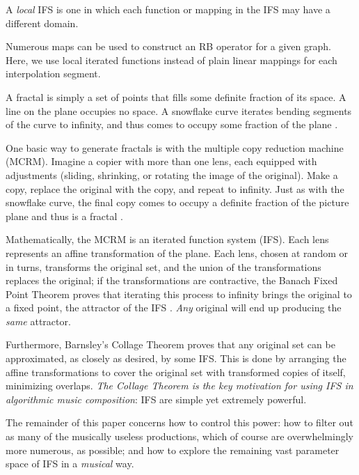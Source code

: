 \documentclass[english,11pt,letterpaper,onecolumn]{scrartcl}
\begin{document}
A \textit{local} IFS is one in which each function or mapping in the IFS may have a different domain.

Numerous maps can be used to construct an RB operator for a given graph. Here, we use local iterated functions 
instead of plain linear mappings for each interpolation segment.

A fractal is simply a set of points that fills some definite fraction of its 
space. A line on the plane occupies no space. A snowflake curve iterates 
bending segments of the curve to infinity, and thus comes to occupy some 
fraction of the plane \cite{Mandelbrot:1982:FGN}.

One basic way to generate fractals is with the multiple copy reduction 
machine (MCRM). Imagine a copier with more than one lens, each equipped with 
adjustments (sliding, shrinking, or rotating the image of the original). Make 
a copy, replace the original with the copy, and repeat to infinity. Just as 
with the snowflake curve, the final copy comes to occupy a definite fraction 
of the picture plane and thus is a fractal \cite{chaosandfractals}. 

Mathematically, the MCRM is an iterated function system (IFS). Each lens 
represents an affine transformation of the plane. Each lens, chosen at random 
or in turns, transforms the original set, and the union of the transformations  
replaces the original; if the transformations are contractive, 
the Banach Fixed Point Theorem proves that iterating this process to infinity 
brings the original to a fixed point, the attractor of the IFS 
\cite{chaosandfractals, barnsley1985iterated, 10.2307/24893080, 
fractalseverywhere}. \textit{Any} original will end up producing the 
\textit{same} attractor. 

Furthermore, Barnsley's Collage Theorem \cite{barnsley:1986:solution} proves 
that any original set can be approximated, as closely as desired, by some IFS. 
This is done by arranging the affine transformations to cover the original set 
with transformed copies of itself, minimizing overlaps. \textit{The Collage 
Theorem is the key motivation for using IFS in algorithmic music composition}: 
IFS are simple yet extremely powerful. 

The remainder of this paper concerns how to control this power: how to 
filter out as many of the musically useless productions, which of course are 
overwhelmingly more numerous, as possible; and how to explore the 
remaining vast parameter space of IFS in a \textit{musical} way.
\end{document}
